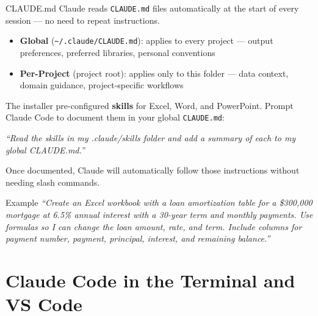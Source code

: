 \documentclass[aspectratio=169]{beamer}
\begin{document}
\begin{frame}{CLAUDE.md}
Claude reads \texttt{CLAUDE.md} files automatically at the start of every session --- no need to repeat instructions.
\vspace{0.3cm}
\begin{itemize}
  \item \textbf{Global} (\texttt{\textasciitilde/.claude/CLAUDE.md}): applies to every project --- output preferences, preferred libraries, personal conventions
  \item \textbf{Per-Project} (project root): applies only to this folder --- data context, domain guidance, project-specific workflows
\end{itemize}
\vspace{0.3cm}
The installer pre-configured \textbf{skills} for Excel, Word, and PowerPoint.  Prompt Claude Code to document them in your global \texttt{CLAUDE.md}:
\vspace{0.2cm}

\textit{``Read the skills in my .claude/skills folder and add a summary of each to my global CLAUDE.md.''}
\vspace{0.2cm}

Once documented, Claude will \alert{automatically} follow those instructions without needing slash commands.
\end{frame}

\begin{frame}{Example}
\textit{``Create an Excel workbook with a loan amortization table for a \$300{,}000 mortgage at 6.5\% annual interest with a 30-year term and monthly payments.  Use formulas so I can change the loan amount, rate, and term.  Include columns for payment number, payment, principal, interest, and remaining balance.''}
\end{frame}

\section{Claude Code in the Terminal and VS Code}
\end{document}
